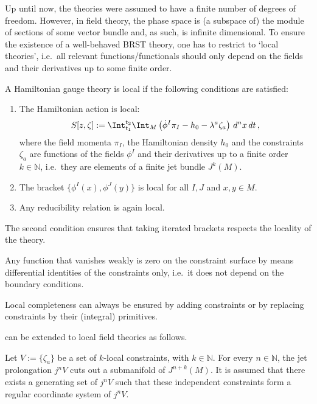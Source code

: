     Up until now, the theories were assumed to have a finite number of degrees of freedom. However, in field theory, the phase space is (a subspace of) the module of sections of some vector bundle and, as such, is infinite dimensional. To ensure the existence of a well-behaved BRST theory, one has to restrict to `local theories', i.e.~all relevant functions/functionals should only depend on the fields and their derivatives up to some finite order.
    \begin{axiom}[Locality]
        A Hamiltonian gauge theory is local if the following conditions are satisfied:
        \begin{enumerate}
            \item The Hamiltonian action is local:
            \begin{gather}
                \label{constraint:hamiltonian_action}
                S[z,\zeta] := \Int_{t_1}^{t_2}\Int_M\left(\dot{\phi}^I\pi_I-h_0-\lambda^a\zeta_a\right)\,d^nx\,dt\,,
            \end{gather}
            where the field momenta $\pi_I$, the Hamiltonian density $h_0$ and the constraints $\zeta_a$ are functions of the fields $\phi^I$ and their derivatives up to a finite order $k\in\mathbb{N}$, i.e.~they are elements of a finite jet bundle $J^k(M)$.
            \item The bracket $\{\phi^I(x),\phi^J(y)\}$ is local for all $I,J$ and $x,y\in M$.
            \item Any reducibility relation is again local.
        \end{enumerate}
        The second condition ensures that taking iterated brackets respects the locality of the theory.
    \end{axiom}

    \begin{axiom}
        Any function that vanishes weakly is zero on the constraint surface by means differential identities of the constraints only, i.e.~it does not depend on the boundary conditions.
    \end{axiom}
    \begin{remark}
        Local completeness can always be ensured by adding constraints or by replacing constraints by their (integral) primitives.
    \end{remark}

     can be extended to local field theories as follows.
    \begin{axiom}
        Let $V:=\{\zeta_a\}$ be a set of $k$-local constraints, with $k\in\mathbb{N}$. For every $n\in\mathbb{N}$, the jet prolongation $j^nV$ cuts out a submanifold of $J^{n+k}(M)$. It is assumed that there exists a generating set of $j^nV$ such that these independent constraints form a regular coordinate system of $j^nV$.
    \end{axiom}


